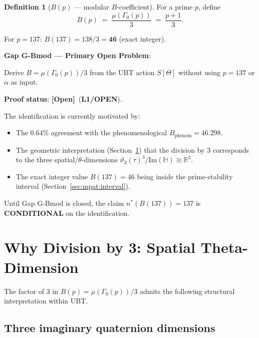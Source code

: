 \documentclass[12pt,a4paper]{article}
\theoremstyle{definition}
\newtheorem{definition}[theorem]{Definition}
\theoremstyle{remark}
\newcommand{\RR}{\mathbb{R}}
\newcommand{\HH}{\mathbb{H}}
\newcommand{\vth}{\vartheta}
\newcommand{\OPEN}{\textbf{[Open]}}
\begin{document}
\begin{definition}[$B(p)$ — modular $B$-coefficient]
\label{def:mpat:B}
For a prime $p$, define
\begin{equation}
  B(p)
  \;=\;
  \frac{\mu(\Gamma_0(p))}{3}
  \;=\;
  \frac{p+1}{3}.
  \label{eq:mpat:Bdef}
\end{equation}
\end{definition}

For $p = 137$: $B(137) = 138/3 = \mathbf{46}$ (exact integer).

\begin{gapbox}
\textbf{Gap G-Bmod — Primary Open Problem}:

Derive $B = \mu(\Gamma_0(p))/3$ from the UBT action $S[\Theta]$ without using
$p = 137$ or $\alpha$ as input.

\textbf{Proof status}: \OPEN\ (\textbf{L1/OPEN}).

The identification is currently motivated by:
\begin{itemize}
  \item The 0.64\% agreement with the phenomenological $B_{\mathrm{phenom}} = 46.298$.
  \item The geometric interpretation (Section~\ref{sec:mpat:theta3}) that the
        division by 3 corresponds to the three spatial/$\theta$-dimensions
        $\vth_3(\tau)^3/\mathrm{Im}(\HH) \cong \RR^3$.
  \item The exact integer value $B(137) = 46$ being inside the prime-stability
        interval (Section~\ref{sec:mpat:interval}).
\end{itemize}
Until Gap G-Bmod is closed, the claim $n^*(B(137)) = 137$ is \textbf{CONDITIONAL}
on the identification.
\end{gapbox}

\section{Why Division by 3: Spatial Theta-Dimension}
\label{sec:mpat:theta3}

The factor of 3 in $B(p) = \mu(\Gamma_0(p))/3$ admits the following
structural interpretation within UBT.

\subsection{Three imaginary quaternion dimensions}
\end{document}
